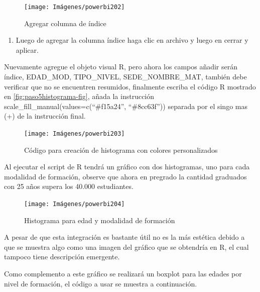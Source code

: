 \documentclass[
]{book}
\providecommand{\tightlist}{%
  \setlength{\itemsep}{0pt}\setlength{\parskip}{0pt}}
\begin{document}
\begin{figure}

{\centering \texttt{[image: Imágenes/powerbi202]} 

}

\caption{Agregar columna de índice}\label{fig:correccionhistograma-fig}
\end{figure}

\begin{enumerate}
\def\labelenumi{\arabic{enumi}.}
\setcounter{enumi}{2}
\tightlist
\item
  Luego de agregar la columna índice haga clic en archivo y luego en cerrar y aplicar.
\end{enumerate}

Nuevamente agregue el objeto visual R, pero ahora los campos añadir serán índice, EDAD\_MOD, TIPO\_NIVEL, SEDE\_NOMBRE\_MAT, también debe verificar que no se encuentren resumidos, finalmente escriba el código R mostrado en \ref{fig:paso5histograma-fig}, añada la instrucción scale\_fill\_manual(values=c(``\#f15a24'', ``\#8cc63f'')) separada por el singo mas (+) de la instrucción final.

\begin{figure}

{\centering \texttt{[image: Imágenes/powerbi203]} 

}

\caption{Código para creación de histograma con colores personalizados}\label{fig:correccionhistogramacodigo-fig}
\end{figure}

Al ejecutar el script de R tendrá un gráfico con dos histogramas, uno para cada modalidad de formación, observe que ahora en pregrado la cantidad graduados con 25 años supera los 40.000 estudiantes.

\begin{figure}

{\centering \texttt{[image: Imágenes/powerbi204]} 

}

\caption{Histograma para edad y modalidad de formación}\label{fig:histogramapowerbi-fig}
\end{figure}

A pesar de que esta integración es bastante útil no es la más estética debido a que se muestra algo como una imagen del gráfico que se obtendría en R, el cual tampoco tiene descripción emergente.

Como complemento a este gráfico se realizará un boxplot para las edades por nivel de formación, el código a usar se muestra a continuación.
\end{document}
